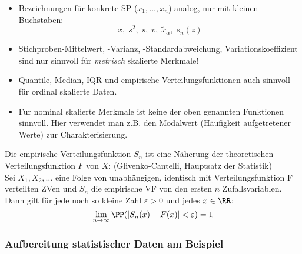 \begin{itemize}
\item Bezeichnungen für konkrete SP ($x_1, \ldots ,x_n$) analog, nur mit kleinen Buchstaben:
$$\overline{x},\; s^2,\; s, \; v, \; \tilde{x}_\alpha, \; s_n(z) $$
\item Stichproben-Mittelwert, -Varianz, -Standardabweichung, Variationskoeffizient sind nur sinnvoll für \emph{metrisch} skalierte Merkmale!
\item Quantile, Median, IQR und empirische Verteilungsfunktionen auch sinnvoll für ordinal skalierte Daten.
\item Fur nominal skalierte Merkmale ist keine der oben genannten Funktionen sinnvoll. Hier verwendet man z.B. den Modalwert (Häufigkeit aufgetretener Werte) zur Charakterisierung.
\end{itemize}
Die empirische Verteilungsfunktion $S_n$ ist eine Näherung der theoretischen Verteilungsfunktion $F$ von $X$:
 (Glivenko-Cantelli, Hauptsatz der Statistik)\\
Sei $X_1, X_2, \ldots$ eine Folge von unabhängigen, identisch mit Verteilungsfunktion F verteilten ZVen und $S_n$ die empirische VF von den ersten $n$ Zufallsvariablen. Dann gilt für jede noch so kleine Zahl $\varepsilon > 0$ und jedes $x \in \RR$:
$$\lim_{n\to \infty} \PP(|S_n(x) - F(x)|<\varepsilon) = 1$$

\subsubsection{Aufbereitung statistischer Daten am Beispiel}

